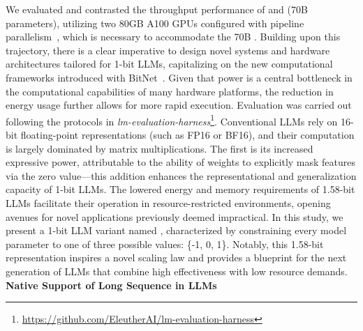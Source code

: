 \begin{itemize}
We evaluated and contrasted the throughput performance of  and  (70B parameters), utilizing two 80GB A100 GPUs configured with pipeline parallelism~\cite{gpipe}, which is necessary to accommodate the 70B . Building upon this trajectory, there is a clear imperative to design novel systems and hardware architectures tailored for 1-bit LLMs, capitalizing on the new computational frameworks introduced with BitNet~\cite{bitnet}. Given that power is a central bottleneck in the computational capabilities of many hardware platforms, the reduction in energy usage further allows for more rapid execution. Evaluation was carried out following the protocols in \emph{lm-evaluation-harness}\footnote{\url{https://github.com/EleutherAI/lm-evaluation-harness}}. Conventional LLMs rely on 16-bit floating-point representations (such as FP16 or BF16), and their computation is largely dominated by matrix multiplications. The first is its increased expressive power, attributable to the ability of weights to explicitly mask features via the zero value—this addition enhances the representational and generalization capacity of 1-bit LLMs. The lowered energy and memory requirements of 1.58-bit LLMs facilitate their operation in resource-restricted environments, opening avenues for novel applications previously deemed impractical. In this study, we present a 1-bit LLM variant named \textbf{}, characterized by constraining every model parameter to one of three possible values: \{-1, 0, 1\}. Notably, this 1.58-bit representation inspires a novel scaling law and provides a blueprint for the next generation of LLMs that combine high effectiveness with low resource demands. \textbf{Native Support of Long Sequence in LLMs}


\end{itemize}
